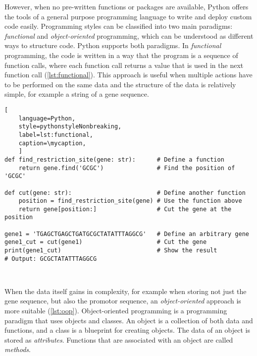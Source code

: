 However, when no pre-written functions or packages are available, Python offers
the tools of a general purpose programming language to write and deploy custom
code easily. Programming styles can be classified into two main paradigms:
\emph{functional} and \emph{object-oriented} programming, which can be
understood as different ways to structure code. Python supports both paradigms.
In \emph{functional} programming, the code is written in a way that the program is a
sequence of function calls, where each function call returns a value that is
used in the next function call (\autoref{lst:functional}). This approach is
useful when multiple actions have to be performed on the same data and the
structure of the data is relatively simple, for example a string of a gene
sequence.

\def\mycaption{ Example of functional programming in Python. The code
    defines a function called ``\texttt{find\_restriction\_site}'' that
    finds the position of a restriction site in a gene. The function
    ``\texttt{cut}'' uses the function ``\texttt{find\_restriction\_site}''
    to cut the gene at the restriction site.}
\begin{lstlisting}[
    language=Python,
    style=pythonstyleNonbreaking,
    label=lst:functional,
    caption=\mycaption,
    ]
def find_restriction_site(gene: str):      # Define a function
    return gene.find('GCGC')               # Find the position of 'GCGC'
    
def cut(gene: str):                        # Define another function
    position = find_restriction_site(gene) # Use the function above
    return gene[position:]                 # Cut the gene at the position
    
gene1 = 'TGAGCTGAGCTGATGCGCTATATTTAGGCG'   # Define an arbitrary gene
gene1_cut = cut(gene1)                     # Cut the gene
print(gene1_cut)                           # Show the result
# Output: GCGCTATATTTAGGCG
    
    
\end{lstlisting}


When the data itself gains in complexity, for example when storing not just the
gene sequence, but also the promotor sequence, an \emph{object-oriented} approach is
more suitable (\autoref{lst:oop}). Object-oriented programming is a programming
paradigm that uses objects and classes. An object is a collection of both data
and functions, and a class is a blueprint for creating objects. The data of an
object is stored as \emph{attributes}. Functions that are associated with an object are
called \emph{methods}.


